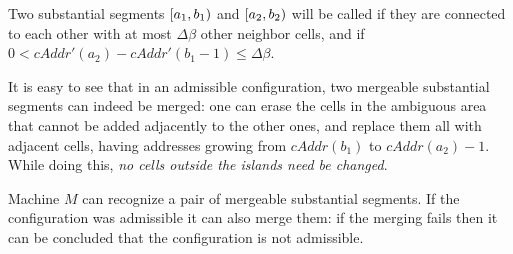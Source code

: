 \documentclass[12pt]{memoir}
\renewcommand{\le}{\leq}
\newcommand{\fld}[1]{\ensuremath{\textit{#1}}}
\newcommand{\cAddr}{\fld{cAddr}}
\begin{document}
\begin{definition}
Two substantial  segments \( [a_{1},b_{1}) \) and \( [a_{2},b_{2}) \) will be
called  if they are connected to each other with at most
\( \Delta\beta \) other neighbor cells, and if \( 0<\cAddr'(a_{2})-\cAddr'(b_{1}-1)\le \Delta\beta \).  
\end{definition}

It is easy to see that in an admissible configuration, two mergeable substantial segments can indeed
be merged: one can erase the cells in the ambiguous area
that cannot be added adjacently to the other ones, and replace them all with adjacent cells,
having addresses growing from \( \cAddr(b_{1}) \) to \( \cAddr(a_{2})-1 \).
While doing this, \emph{no cells outside the islands need be changed}.

Machine \( M \) can recognize a pair of mergeable substantial segments.
If the configuration was admissible it can also merge them: if the merging
fails then it can be concluded that the configuration is not admissible.
\end{document}
